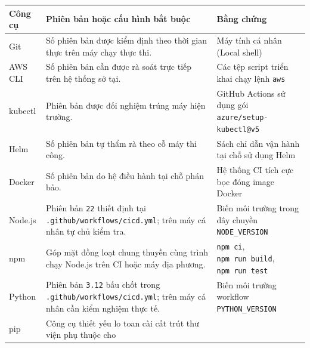 {
\begingroup
\small
\setlength{\tabcolsep}{3pt}
\renewcommand{\arraystretch}{1.15}
\begin{longtable}{@{}
  >{\raggedright\arraybackslash}p{}
  >{\raggedright\arraybackslash}p{}
  >{\raggedright\arraybackslash}p{}@{}}
\toprule\noalign{}
\begin{minipage}[b]{\linewidth}\raggedright
Công cụ
\end{minipage} & \begin{minipage}[b]{\linewidth}\raggedright
Phiên bản hoặc cấu hình bắt buộc
\end{minipage} & \begin{minipage}[b]{\linewidth}\raggedright
Bằng chứng
\end{minipage} \\
\midrule\noalign{}
\endhead
\bottomrule\noalign{}
\endlastfoot
Git & Số phiên bản được kiểm định theo thời gian thực trên máy chạy thực
thi. & Máy tính cá nhân (Local shell) \\
AWS CLI & Số phiên bản cần được rà soát trực tiếp trên hệ thống sở tại.
& Các tệp script triển khai chạy lệnh \texttt{aws} \\
kubectl & Phiên bản được đối nghiệm trúng máy hiện trường. & GitHub
Actions sử dụng gói \texttt{azure/\allowbreak{}setup-\allowbreak{}kubectl@v5} \\
Helm & Số phiên bản tự thẩm rà theo cỗ máy thi công. & Sách chỉ dẫn vận
hành tại chỗ sử dụng Helm \\
Docker & Số phiên bản do hệ điều hành tại chỗ phán bảo. & Hệ thống CI
tích cực bọc đóng image Docker \\
Node.js & Phiên bản \texttt{22} thiết định tại
\texttt{.\allowbreak{}github/\allowbreak{}workflows/\allowbreak{}cicd.\allowbreak{}yml}; trên máy cá nhân tự chủ kiểm tra. &
Biến môi trường trong dây chuyền \texttt{NODE\_\allowbreak{}VERSION} \\
npm & Góp mặt đồng loạt chung thuyền cùng trình chạy Node.js trên CI
hoặc máy địa phương. & \texttt{npm\ ci}, \texttt{npm\ run\ build},
\texttt{npm\ run\ test} \\
Python & Phiên bản \texttt{3.\allowbreak{}12} bấu chốt trong
\texttt{.\allowbreak{}github/\allowbreak{}workflows/\allowbreak{}cicd.\allowbreak{}yml}; trên máy cá nhân cần kiểm nghiệm
thực tế. & Biến môi trường workflow \texttt{PYTHON\_\allowbreak{}VERSION} \\
pip & Công cụ thiết yếu lo toan cài cất trút thư viện phụ thuộc cho

\end{longtable}}
